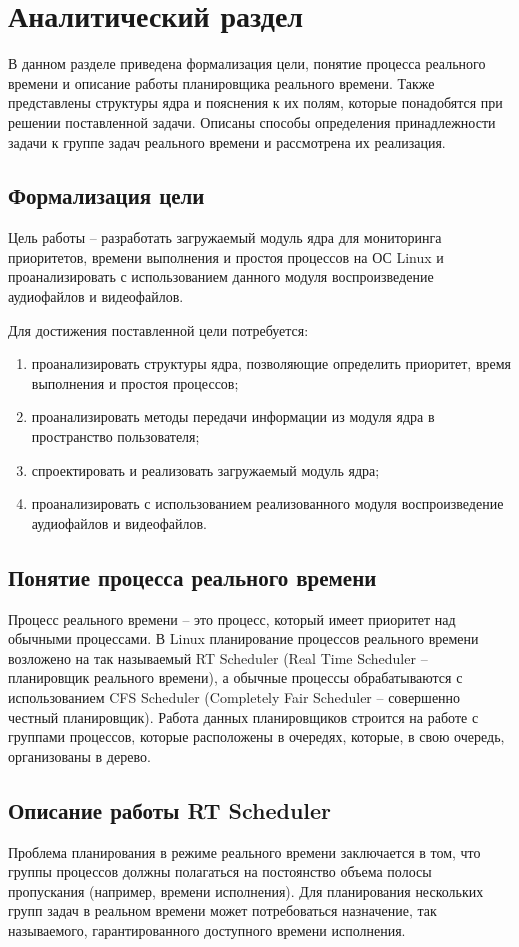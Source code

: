 \section{Аналитический раздел}
В данном разделе приведена формализация цели, понятие процесса реального времени и описание работы планировщика реального времени. Также представлены структуры ядра и пояснения к их полям, которые понадобятся при решении поставленной задачи. Описаны способы определения принадлежности задачи к группе задач реального времени и рассмотрена их реализация.

\subsection{Формализация цели}
Цель работы -- разработать загружаемый модуль ядра для мониторинга приоритетов, времени выполнения и простоя процессов на ОС Linux и проанализировать с использованием данного модуля воспроизведение аудиофайлов и видеофайлов.

Для достижения поставленной цели потребуется:
\begin{enumerate}[leftmargin=1.6\parindent]
\item проанализировать структуры ядра, позволяющие определить приоритет, время выполнения и простоя процессов;
\item проанализировать методы передачи информации из модуля ядра в пространство пользователя;
\item спроектировать и реализовать загружаемый модуль ядра;
\item проанализировать с использованием реализованного модуля воспроизведение аудиофайлов и видеофайлов.
\end{enumerate}

\subsection{Понятие процесса реального времени}
Процесс реального времени -- это процесс, который имеет приоритет над обычными процессами. В Linux планирование процессов реального времени возложено на так называемый RT Scheduler (Real Time Scheduler -- планировщик реального времени), а обычные процессы обрабатываются с использованием CFS Scheduler (Completely Fair Scheduler -- совершенно честный планировщик). Работа данных планировщиков строится на работе с группами процессов, которые расположены в очередях, которые, в свою очередь, организованы в дерево. \cite{realtimeprocesses}

\subsection{Описание работы RT Scheduler}
Проблема планирования в режиме реального времени заключается в том, что группы процессов должны полагаться на постоянство объема полосы пропускания (например, времени исполнения). Для планирования нескольких групп задач в реальном времени может потребоваться назначение, так называемого, гарантированного доступного времени исполнения. \cite{linuxkerneldocs}


